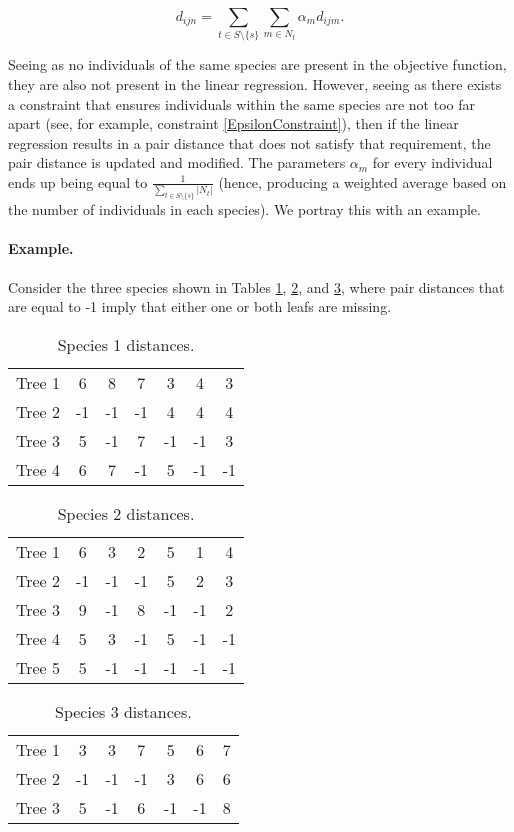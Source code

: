 \documentclass[12pt]{amsart}
\begin{document}
$$d_{ijn} = \sum\limits_{t\in S\setminus\{s\}}\sum\limits_{m\in N_t} \alpha_m d_{ijm}.$$

Seeing as no individuals of the same species are present in the objective function, they are also not present in the linear regression. However, seeing as there exists a constraint that ensures individuals within the same species are not too far apart (see, for example, constraint \eqref{EpsilonConstraint}), then if the linear regression results in a pair distance that does not satisfy that requirement, the pair distance is updated and modified. The parameters $\alpha_m$ for every individual ends up being equal to $\frac{1}{\sum\limits_{t\in S\setminus\{s\}} |N_t|}$ (hence, producing a weighted average based on the number of individuals in each species). We portray this with an example. 

\paragraph{Example.} Consider the three species shown in Tables \ref{species1}, \ref{species2}, and \ref{species3}, where pair distances that are equal to -1 imply that either one or both leafs are missing. 

\begin{table}[h]
\caption{Species 1 distances. \label{species1}}
\begin{tabular}{l|cccccc}
Tree 1 & 6 &  8 & 7 & 3 &  4 & 3 \\
Tree 2 & -1 & -1 & -1 &  4 & 4 &  4 \\
Tree 3 & 5 &  -1&  7&  -1&  -1&  3 \\
Tree 4 & 6 & 7 & -1 & 5 & -1 & -1 
\end{tabular}
\end{table}

\begin{table}[h]
\caption{Species 2 distances. \label{species2}}
\begin{tabular}{l|cccccc}
Tree 1&6& 3& 2& 5& 1& 4\\
Tree 2&-1& -1& -1& 5& 2& 3\\
Tree 3&9& -1& 8& -1& -1& 2\\
Tree 4&5& 3& -1& 5& -1& -1\\
Tree 5&5& -1& -1& -1& -1& -1 
\end{tabular}
\end{table}

\begin{table}[h]
\caption{Species 3 distances. \label{species3}}
\begin{tabular}{l|cccccc}
Tree 1&3& 3& 7& 5& 6& 7\\
Tree 2&-1& -1& -1& 3& 6& 6\\
Tree 3&5& -1& 6& -1& -1& 8
\end{tabular}
\end{table}
\end{document}
